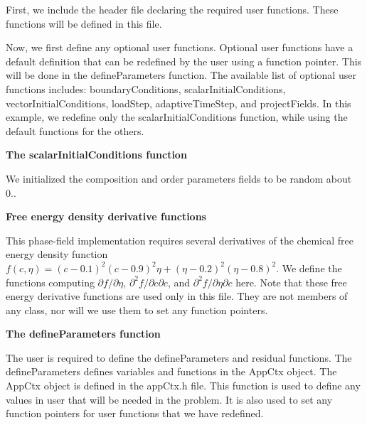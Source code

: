 First, we include the header file declaring the required user functions. These functions will be defined in this file.


\begin{DoxyCodeInclude}

\end{DoxyCodeInclude}


Now, we first define any optional user functions. Optional user functions have a default definition that can be redefined by the user using a function pointer. This will be done in the {\ttfamily define\-Parameters} function. The available list of optional user functions includes\-: {\ttfamily boundary\-Conditions}, {\ttfamily scalar\-Initial\-Conditions}, {\ttfamily vector\-Initial\-Conditions}, {\ttfamily load\-Step}, {\ttfamily adaptive\-Time\-Step}, and {\ttfamily project\-Fields}. In this example, we redefine only the {\ttfamily scalar\-Initial\-Conditions} function, while using the default functions for the others.

{\bfseries  The {\ttfamily scalar\-Initial\-Conditions} function }

We initialized the composition and order parameters fields to be random about 0..


\begin{DoxyCodeInclude}

\end{DoxyCodeInclude}


{\bfseries  Free energy density derivative functions }

This phase-\/field implementation requires several derivatives of the chemical free energy density function $f(c,\eta) = (c - 0.1)^2(c - 0.9)^2\eta + (\eta - 0.2)^2(\eta-0.8)^2$. We define the functions computing $\partial f/\partial\eta$, $\partial^2 f/\partial c \partial c$, and $\partial^2 f/\partial\eta \partial c$ here. Note that these free energy derivative functions are used only in this file. They are not members of any class, nor will we use them to set any function pointers.


\begin{DoxyCodeInclude}

\end{DoxyCodeInclude}


{\bfseries  The {\ttfamily define\-Parameters} function }

The user is required to define the {\ttfamily define\-Parameters} and {\ttfamily residual} functions. The {\ttfamily define\-Parameters} defines variables and functions in the {\ttfamily App\-Ctx} object. The {\ttfamily App\-Ctx} object is defined in the app\-Ctx.\-h file. This function is used to define any values in {\ttfamily user} that will be needed in the problem. It is also used to set any function pointers for user functions that we have redefined.


